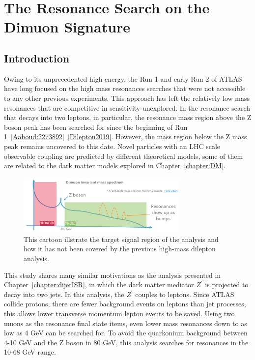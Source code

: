 \chapter{The Resonance Search on the Dimuon Signature}
\label{chapter:dimuon}

\section{Introduction}

Owing to its unprecedented high energy, the Run 1 and early Run 2 of ATLAS have long focused on the high mass resonances searches that were not accessible to any other previous experiments. This approach has left the relatively low mass resonances that are competitive in sensitivity unexplored. In the resonance search that decays into two leptons, in particular, the resonance mass region above the Z boson peak has been searched for since the beginning of Run
1~\ref{Aaboud:2273892}~\ref{Dilepton2019}. However, the mass region below the Z mass peak remains uncovered to this date. Novel particles with an LHC scale observable coupling are predicted by different theoretical models, some of them are related to the dark matter models explored in Chapter~\ref{chapter:DM}.

\begin{figure}[!htb]
    \begin{center}
        \includegraphics[width=0.75\textwidth]{figures/chapter_dimuon/dimuonStudies}        
        \caption{
        This cartoon illstrate the target signal region of the analysis and how it has not been covered by the previous high-mass dilepton analysis. }
            \label{fig:dimuonstudies}
    \end{center}
\end{figure}
\FloatBarrier
   
This study shares many similar motivations as the analysis presented in Chapter~\ref{chapter:dijetISR}, in which the dark matter mediator $Z^\prime$ is projected to decay into two jets. In this analysis, the $Z^\prime$ couples to leptons. Since ATLAS collide protons, there are fewer background events on leptons than jet processes, this allows lower transverse momentum lepton events to be saved. Using two muons as the resonance final state items, even lower mass resonances
down to as low as 4 GeV can be searched for. To avoid the quarkonium background between 4-10 GeV and the Z boson in 80 GeV, this analysis searches for resonances in the 10-68 GeV range.

